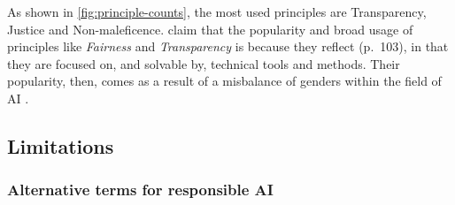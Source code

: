 
As shown in \autoref{fig:principle-counts}, the most used principles are Transparency, Justice and Non-maleficence. 
\textcite{Hagendorff_2020} claim that the popularity and broad usage of principles like \textit{Fairness} and \textit{Transparency} is because they reflect  (p.~103), in that they are focused on, and solvable by, technical tools and methods. Their popularity, then, comes as a result of a misbalance of genders within the field of AI \parencite{Hagendorff_2020}.


\subsection{Limitations}\label{sec:Limitations}





\subsubsection{Alternative terms for responsible AI}
\label{sec:results-alernative-terms}



